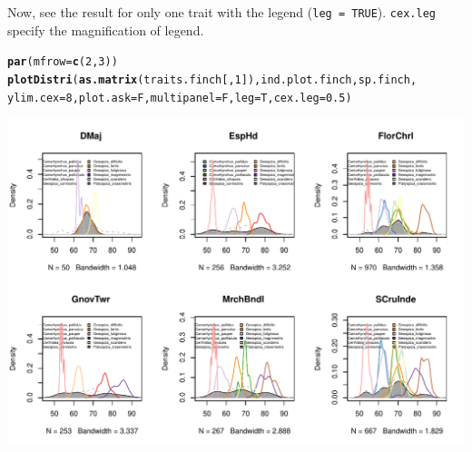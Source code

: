 \documentclass[12pt]{article}\usepackage[]{graphicx}\usepackage[]{color}
\makeatletter
\def\maxwidth{ %
  \ifdim\Gin@nat@width>\linewidth
    \linewidth
  \else
    \Gin@nat@width
  \fi
}
\newcommand{\hlnum}[1]{\textcolor[rgb]{0.686,0.059,0.569}{#1}}%
\newcommand{\hlstd}[1]{\textcolor[rgb]{0.345,0.345,0.345}{#1}}%
\newcommand{\hlkwc}[1]{\textcolor[rgb]{0.333,0.667,0.333}{#1}}%
\newcommand{\hlkwd}[1]{\textcolor[rgb]{0.737,0.353,0.396}{\textbf{#1}}}%
\newenvironment{kframe}{%
 \def\at@end@of@kframe{}%
 \ifinner\ifhmode%
  \def\at@end@of@kframe{\end{minipage}}%
  \begin{minipage}{\columnwidth}%
 \fi\fi%
 \def\FrameCommand##1{\hskip\@totalleftmargin \hskip-\fboxsep
 \colorbox{shadecolor}{##1}\hskip-\fboxsep
     \hskip-\linewidth \hskip-\@totalleftmargin \hskip\columnwidth}%
 \MakeFramed {\advance\hsize-\width
   \@totalleftmargin\z@ \linewidth\hsize
   \@setminipage}}%
 {\par\unskip\endMakeFramed%
 \at@end@of@kframe}
\newenvironment{knitrout}{}{} %
\makeatother
\begin{document}
\begin{knitrout}
\end{knitrout}

Now, see the result for only one trait with the legend (\texttt{leg = TRUE}). \texttt{cex.leg} specify the magnification of legend. 

\begin{knitrout}
\color{fgcolor}\begin{kframe}
\begin{alltt}
\hlkwd{par}\hlstd{(}\hlkwc{mfrow} \hlstd{=} \hlkwd{c}\hlstd{(}\hlnum{2}\hlstd{,}\hlnum{3}\hlstd{))}
\hlkwd{plotDistri}\hlstd{(}\hlkwd{as.matrix}\hlstd{(traits.finch[,}\hlnum{1}\hlstd{]), ind.plot.finch, sp.finch,}
          \hlkwc{ylim.cex} \hlstd{=} \hlnum{8}\hlstd{,} \hlkwc{plot.ask} \hlstd{= F,} \hlkwc{multipanel} \hlstd{= F,} \hlkwc{leg} \hlstd{= T,} \hlkwc{cex.leg} \hlstd{=} \hlnum{0.5}\hlstd{)}
\end{alltt}
\end{kframe}
\includegraphics[width=\maxwidth]{figure/unnamed-chunk-12-1} 

\end{knitrout}
\end{document}
